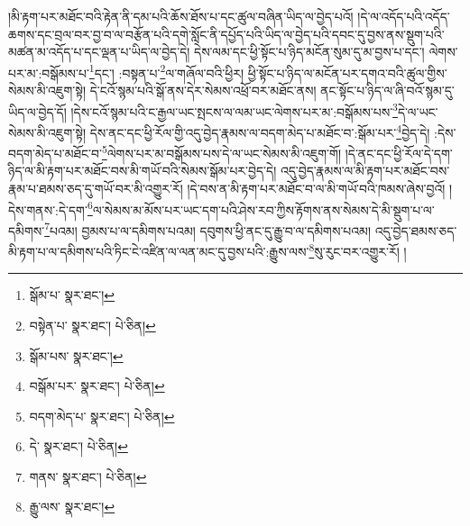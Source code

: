 །མི་རྟག་པར་མཐོང་བའི་རྟེན་ནི་དམ་པའི་ཆོས་ཐོས་པ་དང་ཚུལ་བཞིན་ཡིད་ལ་བྱེད་པའོ། །དེ་ལ་འདོད་པའི་འདོད་ཆགས་དང་བྲལ་བར་བྱ་བ་ལ་བརྩོན་པའི་དགེ་སློང་ནི་དཔྱོད་པའི་ཡིད་ལ་བྱེད་པའི་དབང་དུ་བྱས་ནས་སྡུག་པའི་མཚན་མ་འདོད་པ་དང་ལྡན་པ་ཡིད་ལ་བྱེད་དེ། དེས་ལམ་དང་ཕྱི་སྟོང་པ་ཉིད་མངོན་སུམ་དུ་མ་བྱས་པ་དང་། ལེགས་པར་མ་:བསྒོམས་པ་\footnote{སྒོམ་པ་  སྣར་ཐང་། }དང་། :བསྟན་པ་\footnote{བསྟེན་པ་  སྣར་ཐང་།  པེ་ཅིན། }ལ་གཞོལ་བའི་ཕྱིར། ཕྱི་སྟོང་པ་ཉིད་ལ་མངོན་པར་དགའ་བའི་ཚུལ་གྱིས་སེམས་མི་འཇུག་སྟེ། དེ་ངའོ་སྙམ་པའི་སྒོ་ནས་དེར་སེམས་འཕྲོ་བར་མཐོང་ནས། ནང་སྟོང་པ་ཉིད་ལ་ཞི་བའོ་སྙམ་དུ་ཡིད་ལ་བྱེད་དོ། །དེས་ངའོ་སྙམ་པའི་ང་རྒྱལ་ཡང་སྤངས་ལ་ལམ་ཡང་ལེགས་པར་མ་:བསྒོམས་པས་\footnote{སྒོམ་པས་  སྣར་ཐང་། }དེ་ལ་ཡང་སེམས་མི་འཇུག་སྟེ། དེས་ནང་དང་ཕྱི་རོལ་གྱི་འདུ་བྱེད་རྣམས་ལ་བདག་མེད་པ་མཐོང་བ་:སྒོམ་པར་\footnote{བསྒོམ་པར་  སྣར་ཐང་།  པེ་ཅིན། }བྱེད་དེ། :དེས་བདག་མེད་པ་མཐོང་བ་\footnote{བདག་མེད་པ་  སྣར་ཐང་།  པེ་ཅིན། }ལེགས་པར་མ་བསྒོམས་པས་དེ་ལ་ཡང་སེམས་མི་འཇུག་གོ། །དེ་ནང་དང་ཕྱི་རོལ་དེ་དག་ཉིད་ལ་མི་རྟག་པར་མཐོང་བས་མི་གཡོ་བའི་སེམས་སྒོམ་པར་བྱེད་དེ། འདུ་བྱེད་རྣམས་ལ་མི་རྟག་པར་མཐོང་བས་རྣམ་པ་ཐམས་ཅད་དུ་གཡོ་བར་མི་འགྱུར་རོ། །དེ་བས་ན་མི་རྟག་པར་མཐོང་བ་ལ་མི་གཡོ་བའི་ཁམས་ཞེས་བྱའོ། །དེས་གནས་:དེ་དག་\footnote{དེ་  སྣར་ཐང་།  པེ་ཅིན། }ལ་སེམས་མ་མོས་པར་ཡང་དག་པའི་ཤེས་རབ་ཀྱིས་རྟོགས་ནས་སེམས་དེ་མི་སྡུག་པ་ལ་དམིགས་\footnote{གནས་  སྣར་ཐང་།  པེ་ཅིན། }པའམ། བྱམས་པ་ལ་དམིགས་པའམ། དབུགས་ཕྱི་ནང་དུ་རྒྱུ་བ་ལ་དམིགས་པའམ། འདུ་བྱེད་ཐམས་ཅད་མི་རྟག་པ་ལ་དམིགས་པའི་ཏིང་ངེ་འཛིན་ལ་ལན་མང་དུ་བྱས་པའི་:རྒྱུས་ལས་\footnote{རྒྱུ་ལས་  སྣར་ཐང་། }སུ་རུང་བར་འགྱུར་རོ། །
